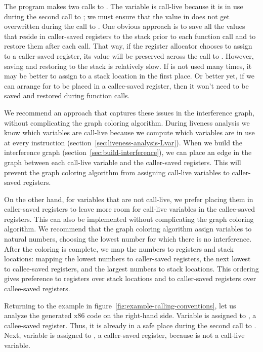 \documentclass[7x10]{TimesAPriori_MIT}%
\numberwithin{theorem}{chapter}
\numberwithin{definition}{chapter}
\numberwithin{equation}{chapter}
\begin{document}
The program makes two calls to \READOP{}.  The variable  is
call-live because it is in use during the second call to \READOP{}; we
must ensure that the value in  does not get overwritten during
the call to \READOP{}.  One obvious approach is to save all the values
that reside in caller-saved registers to the stack prior to each
function call and to restore them after each call. That way, if the
register allocator chooses to assign  to a caller-saved
register, its value will be preserved across the call to \READOP{}.
However, saving and restoring to the stack is relatively slow. If
 is not used many times, it may be better to assign 
to a stack location in the first place. Or better yet, if we can
arrange for  to be placed in a callee-saved register, then it
won't need to be saved and restored during function calls.

We recommend an approach that captures these issues in the
interference graph, without complicating the graph coloring algorithm.
During liveness analysis we know which variables are call-live because
we compute which variables are in use at every instruction
(section~\ref{sec:liveness-analysis-Lvar}). When we build the
interference graph (section~\ref{sec:build-interference}), we can
place an edge in the graph between each call-live
variable and the caller-saved registers. This will prevent the graph
coloring algorithm from assigning call-live variables to caller-saved
registers.

On the other hand, for variables that are not call-live, we prefer
placing them in caller-saved registers to leave more room for
call-live variables in the callee-saved registers. This can also be
implemented without complicating the graph coloring algorithm. We
recommend that the graph coloring algorithm assign variables to
natural numbers, choosing the lowest number for which there is no
interference. After the coloring is complete, we map the numbers to
registers and stack locations: mapping the lowest numbers to
caller-saved registers, the next lowest to callee-saved registers, and
the largest numbers to stack locations. This ordering gives preference
to registers over stack locations and to caller-saved registers over
callee-saved registers.

Returning to the example in
figure~\ref{fig:example-calling-conventions}, let us analyze the
generated x86 code on the right-hand side. Variable  is
assigned to , a callee-saved register. Thus, it is already
in a safe place during the second call to . Next,
variable  is assigned to , a caller-saved register,
because  is not a call-live variable.
\end{document}
